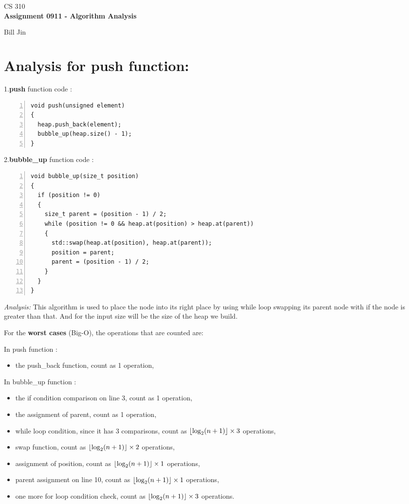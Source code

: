\documentclass[11pt]{article}
\DeclarePairedDelimiter\floor{\lfloor}{\rfloor}
\newcommand{\answer}{\textit{Analysis: } }
\begin{document}
\thispagestyle{empty}

\begin{center}
{\large CS 310}\\
\textbf{Assignment 0911 - Algorithm Analysis}
\end{center}

\begin{flushright}
Bill Jin
\end{flushright}

\section*{Analysis for push function:}

1.\textbf{push} function code $\colon$

\begin{Verbatim}[numbers=left,xleftmargin=5mm]
void push(unsigned element)
{
  heap.push_back(element);
  bubble_up(heap.size() - 1);  
}
\end{Verbatim}

2.\textbf{bubble\_up} function code $\colon$
\begin{Verbatim}[numbers=left,xleftmargin=5mm]
void bubble_up(size_t position)
{
  if (position != 0)
  {
    size_t parent = (position - 1) / 2;
    while (position != 0 && heap.at(position) > heap.at(parent))
    {
      std::swap(heap.at(position), heap.at(parent));
      position = parent;
      parent = (position - 1) / 2;
    }
  }
}
\end{Verbatim}

\answer This algorithm is used to place the node into its right place by using while loop swapping its parent node with if the node is greater than that. And for the input size will be the size of the heap we build.

For the \textbf{worst cases} (Big-O), the operations that are counted are:

In push function $\colon$
\begin{itemize}
\item the push\_back function, count as 1 operation,
\end{itemize}

In bubble\_up function $\colon$
\begin{itemize}
\item the if condition comparison on line 3, count as 1 operation,
\item the assignment of parent, count as 1 operation,
\item while loop condition, since it has 3 comparisons, count as $\floor{ \log_2(n+1)} \times 3$ operations,
\item swap function, count as $\floor{ \log_2(n+1)} \times 2$ operations,
\item assignment of position, count as $\floor{ \log_2(n+1)} \times 1$ operations,
\item parent assignment on line 10, count as $\floor{ \log_2(n+1)} \times 1$ operations,
\item one more for loop condition check, count as $\floor{ \log_2(n+1)} \times 3$ operations.
\end{itemize}
\end{document}
